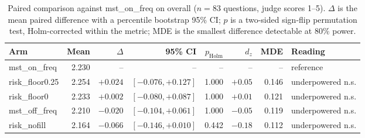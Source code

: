 \begin{table}[t]
\centering
\small
\begin{tabular}{lrrrrrrl}
\toprule
Arm & Mean & $\Delta$ & 95\% CI & $p_{\text{Holm}}$ & $d_z$ & MDE & Reading \\
\midrule
mst\_on\_freq & 2.230 & -- & -- & -- & -- & -- & reference \\
\midrule
risk\_floor0.25 & 2.254 & $+0.024$ & $[-0.076, +0.127]$ & 1.000 & $+0.05$ & 0.146 & underpowered n.s. \\
risk\_floor0 & 2.233 & $+0.002$ & $[-0.080, +0.087]$ & 1.000 & $+0.01$ & 0.121 & underpowered n.s. \\
mst\_off\_freq & 2.210 & $-0.020$ & $[-0.104, +0.061]$ & 1.000 & $-0.05$ & 0.119 & underpowered n.s. \\
risk\_nofill & 2.164 & $-0.066$ & $[-0.146, +0.010]$ & 0.442 & $-0.18$ & 0.112 & underpowered n.s. \\
\bottomrule
\end{tabular}
\caption{Paired comparison against mst\_on\_freq on overall ($n=83$ questions, judge scores 1--5). $\Delta$ is the mean paired difference with a percentile bootstrap 95\% CI; $p$ is a two-sided sign-flip permutation test, Holm-corrected within the metric; MDE is the smallest difference detectable at 80\% power.}
\label{tab:paired-overall}
\end{table}
